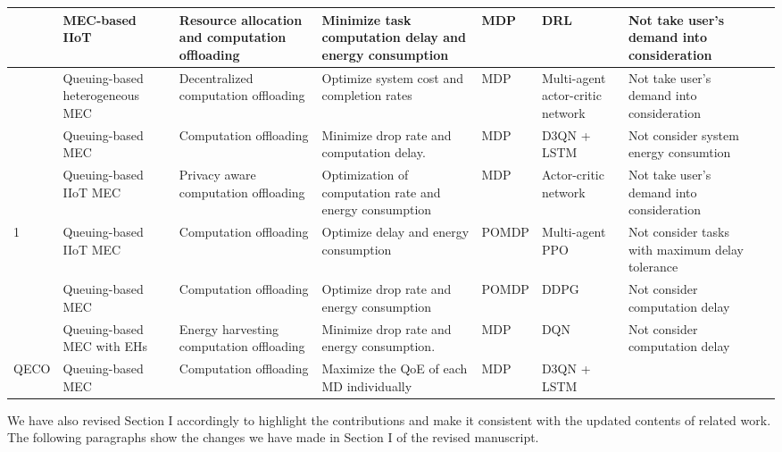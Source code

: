\documentclass[12pt,draftclsnofoot,onecolumn]{IEEEtran}
\begin{document}
\begin{enumerate}
\begin{table}[htbp]
{{\begin{tabular}{ lp{3.4cm}p{4.5cm}p{5.2cm}p{1.7cm}p{3.1cm}p{4.6cm}l}
				\cite{gong2022edge} & MEC-based IIoT & Resource allocation and computation offloading & Minimize task computation delay and energy consumption & MDP & DRL & Not take user's demand into consideration\\\midrule
				\cite{gao2022large} & Queuing-based heterogeneous MEC & Decentralized computation offloading & Optimize system cost and completion rates & MDP & Multi-agent actor-critic network& Not take user's demand into consideration \\\midrule
				\cite{9253665} &  Queuing-based MEC &  Computation offloading & Minimize drop rate and computation delay. & MDP & D3QN + LSTM & Not consider system energy consumtion\\\midrule
				\cite{wu2024combining}  & Queuing-based IIoT MEC & Privacy aware computation offloading & Optimization of computation rate and energy consumption & MDP & Actor-critic network  & Not take user's demand into consideration \\\midrule
				\cite{wu2023multi} 1& Queuing-based IIoT MEC & Computation offloading & Optimize delay and energy consumption & POMDP & Multi-agent PPO&  Not consider tasks with maximum delay tolerance \\\midrule
				\cite{huang2021deadline} & Queuing-based MEC & Computation offloading & Optimize drop rate and energy consumption & POMDP & DDPG & Not consider computation delay \\ \midrule
				\cite{Bolourian-WCL24}  & Queuing-based MEC with EHs& Energy harvesting  computation offloading & Minimize drop rate and energy consumption. & MDP  & DQN & Not consider computation delay  \\\midrule
				QECO &  Queuing-based MEC &  Computation offloading & Maximize the QoE of each MD individually &MDP & D3QN + LSTM & \\
				\toprule
		\end{tabular}}
		\label{table11}}
\end{table}














\vspace{6mm}

We have also revised Section I accordingly to highlight the contributions and make it consistent with the updated contents of related work. The following paragraphs show the changes we have made in Section I of the revised manuscript.










\end{enumerate}
\end{document}
